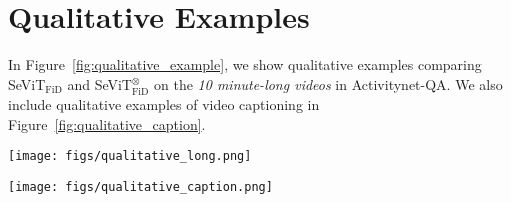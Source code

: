 \documentclass{article}
\newcommand{\frameworkname}{SeViT}
\begin{document}
\section{Qualitative Examples}
\label{appendix:qualitative}

In Figure~\ref{fig:qualitative_example}, we show qualitative examples comparing \frameworkname{}$_\text{FiD}$ and \frameworkname{}$_\text{FiD}^{\otimes}$ on the \textit{10 minute-long videos} in Activitynet-QA. We also include qualitative examples of video captioning in Figure~\ref{fig:qualitative_caption}.

\begin{figure*}[t!] 
\centering
\texttt{[image: figs/qualitative\_long.png]}
\caption{We show efficacy of \frameworkname{} by qualitative examples. To this end, we compare \frameworkname$_\text{FiD}$ and \frameworkname$_\text{FiD}^{\otimes}$ in videos \textit{longer than 10 minutes} from Activitynet-QA. The results show that a baseline based on frame sampling, \frameworkname$_\text{FiD}^{\otimes}$, fails to find relevant frames from the long videos while \frameworkname$_\text{FiD}$ successfully finds query-relevant frames.}
\label{fig:qualitative_example}
\end{figure*}

\begin{figure*}[t!] 
\centering
\texttt{[image: figs/qualitative\_caption.png]}
\caption{Qualitative examples of video captioning. We compare \frameworkname$_\text{FiD}$ and \frameworkname$_\text{FiD}^{\otimes}$ on videos in MSRVTT-Caption (top) and MSVD-Caption (bottom). Especially, the top example shows the case that frames by \frameworkname$_\text{FiD}^{\otimes}$, \ie, random frame sampling, include uninformative frames resulting in performance degradation.}
\label{fig:qualitative_caption}
\end{figure*} 
\end{document}
